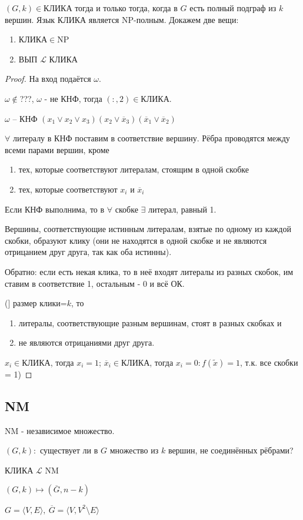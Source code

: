 \documentclass[final]{report}
\newcommand{\w}{\omega}
\newcommand{\nx}{\overline{x}}
\newcommand{\F}{\ensuremath{\forall}}
\newcommand{\E}{\ensuremath{\exists}}
\theoremstyle {remark}
\theoremstyle {remark}
\renewcommand{\ss}[1]
{
\phantomsection
\subsection*{#1}
\addcontentsline{toc}{subsection}{#1}
}
\begin{document}
$(G,k)\in$КЛИКА тогда и только тогда, когда в $G$ есть полный подграф из $k$ вершин.
{\theor Язык КЛИКА является NP-полным.}
Докажем две вещи:
\begin{enumerate}
	\item КЛИКА$\in$NP
	\item ВЫП $\mathcal{L}$ КЛИКА
\end{enumerate}
\begin{proof}
На вход подаётся $\w$.

$\w\notin$???, $\w$ - не КНФ, тогда  $(:,2)\in$КЛИКА.

$\w$ -- КНФ $(x_1\lor x_2\lor x_3)(x_2\lor\nx_3)(\nx_1\lor\nx_2)$

$\forall$ литералу в КНФ поставим в соответствие вершину. Рёбра проводятся между всеми парами вершин, кроме
\begin{enumerate}
\item тех, которые соответствуют литералам, стоящим в одной скобке
\item тех, которые соответствуют $x_i$ и $\nx_i$
\end{enumerate}
Если КНФ выполнима, то в $\F$ скобке $\E$ литерал, равный 1.

Вершины, соответствующие истинным литералам, взятые по одному из каждой скобки, образуют клику (они не находятся в одной скобке и не являются отрицанием друг друга, так как оба истинны).

Обратно: если есть некая клика, то в неё входят литералы из разных скобок, им ставим в соответствие 1, остальным - 0 и всё ОК.

(] размер клики=$k$, то \begin{enumerate}
\item литералы, соответствующие разным вершинам, стоят в разных скобках и
\item не являются отрицаниями друг друга.
\end{enumerate}
$x_i\in$КЛИКА, тогда $x_i=1$; $\nx_i\in$КЛИКА, тогда $x_i=0\colon f(\tilde{x})=1$, т.к. все скобки = 1)
\end{proof}

\ss {NM}

NM - независимое множество.

$(G,k):$ существует ли в $G$ множество из $k$ вершин, не соединённых рёбрами?

КЛИКА $\mathcal{L}$ NM

$(G,k)\mapsto(\overline{G},n-k)$

$G=\langle V,E\rangle,\ \overline{G}=\langle V,V^2\setminus E\rangle$
\end{document}
